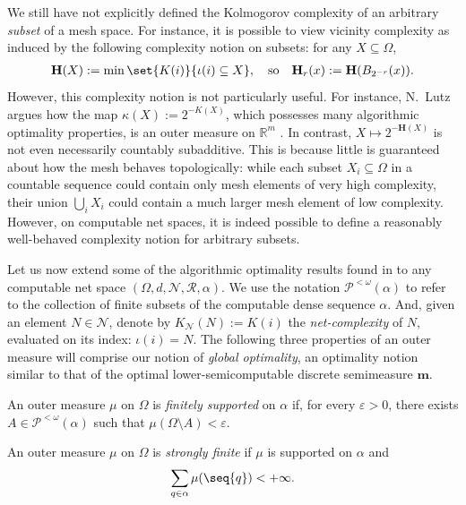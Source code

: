 We still have not explicitly defined the Kolmogorov complexity of an arbitrary \textit{subset} of a mesh space. For instance, it is possible to view vicinity complexity as induced by the following complexity notion on subsets: for any $X \subseteq \Omega$, 
\begin{align*}
    \mathbf{H}(X) := \min \set{K(i)}{\iota(i) \subseteq X}, \quad \text{so} \quad \mathbf{H}_r(x) := \mathbf{H}(B_{2^{-r}}(x)).
\end{align*}
However, this complexity notion is not particularly useful. For instance, N.~Lutz argues how the map $\kappa(X) := 2^{-K(X)}$, which possesses many algorithmic optimality properties, is an outer measure on $\mathbb{R}^m$ \cite{Lut17b, LL20}. In contrast, $X \mapsto 2^{-\mathbf{H}(X)}$ is not even necessarily countably subadditive. This is because little is guaranteed about how the mesh behaves topologically: while each subset $X_i \subseteq \Omega$ in a countable sequence could contain only mesh elements of very high complexity, their union $\bigcup_i X_i$ could contain a much larger mesh element of low complexity. However, on computable net spaces, it is indeed possible to define a reasonably well-behaved complexity notion for arbitrary subsets. 

Let us now extend some of the algorithmic optimality results found in \cite{LL20} to any computable net space $(\Omega, d, \mathcal{N}, \mathscr{R}, \alpha)$. We use the notation $\mathcal{P}^{<\omega}(\alpha)$ to refer to the collection of finite subsets of the computable dense sequence $\alpha$. And, given an element $N \in \mathcal{N}$, denote by $K_{\mathcal{N}}(N) := K(i)$ the \textit{net-complexity} of $N$, evaluated on its index: $\iota(i) = N$. The following three properties of an outer measure will comprise our notion of \textit{global optimality}, an optimality notion similar to that of the optimal lower-semicomputable discrete semimeasure $\mathbf{m}$. 

\begin{definition}
    An outer measure $\mu$ on $\Omega$ is \textit{finitely supported} on $\alpha$ if, for every $\varepsilon > 0$, there exists $A \in \mathcal{P}^{<\omega}(\alpha)$ such that $\mu(\Omega \setminus A) < \varepsilon$.
\end{definition}

\begin{definition}
    An outer measure $\mu$ on $\Omega$ is \textit{strongly finite} if $\mu$ is supported on $\alpha$ and 
    \begin{align*}
        \sum_{q \in \alpha} \mu(\seq{q}) < +\infty.
    \end{align*}
\end{definition}

